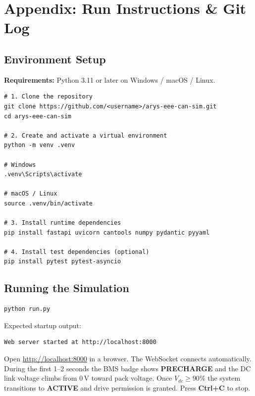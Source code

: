 \documentclass[12pt, a4paper, openany]{report}
\begin{document}
\begin{center}
\begin{enumerate}[leftmargin=2em, label={[\arabic*]}, itemsep=4pt]
\end{enumerate}

\chapter{Appendix: Run Instructions \& Git Log}

\section{Environment Setup}

\textbf{Requirements:} Python 3.11 or later on Windows / macOS / Linux.

\begin{lstlisting}[style=bash]
# 1. Clone the repository
git clone https://github.com/<username>/arys-eee-can-sim.git
cd arys-eee-can-sim

# 2. Create and activate a virtual environment
python -m venv .venv

# Windows
.venv\Scripts\activate

# macOS / Linux
source .venv/bin/activate

# 3. Install runtime dependencies
pip install fastapi uvicorn cantools numpy pydantic pyyaml

# 4. Install test dependencies (optional)
pip install pytest pytest-asyncio
\end{lstlisting}

\section{Running the Simulation}

\begin{lstlisting}[style=bash]
python run.py
\end{lstlisting}

Expected startup output:
\begin{lstlisting}[style=shell]
Web server started at http://localhost:8000
\end{lstlisting}

Open \url{http://localhost:8000} in a browser. The WebSocket connects
automatically. During the first 1--2 seconds the BMS badge shows
\textbf{PRECHARGE} and the DC link voltage climbs from 0\,V toward pack
voltage. Once $V_{dc} \geq 90\%$ the system transitions to \textbf{ACTIVE}
and drive permission is granted. Press \textbf{Ctrl+C} to stop.


\end{center}
\end{document}
